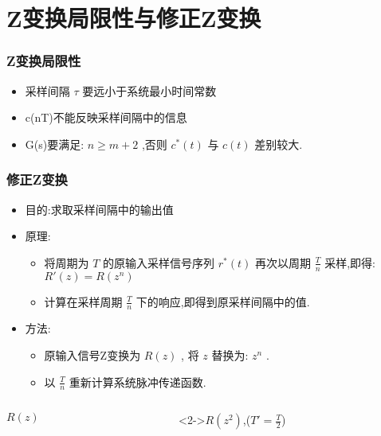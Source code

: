 \documentclass[table]{beamer}
\begin{document}
\section{Z变换局限性与修正Z变换}
\label{sec-5}
\begin{frame}
\frametitle{Z变换局限性}
\label{sec-5-1}

\begin{itemize}
\item <2->采样间隔 $\tau$  要远小于系统最小时间常数
\item <3->c(nT)不能反映采样间隔中的信息
\item <4->G(s)要满足:  $n\geq m+2$  ,否则  $c^*(t)$  与  $c(t)$  差别较大.
\end{itemize}
\end{frame}
\begin{frame}
\frametitle{修正Z变换}
\label{sec-5-2}

\begin{itemize}
\item 目的:求取采样间隔中的输出值
\item 原理:
\begin{itemize}
\item <2->将周期为  $T$  的原输入采样信号序列 $r^*(t)$ 再次以周期  $\frac{T}{n}$  采样,即得:  $R'(z)=R(z^n)$
\item <3->计算在采样周期  $\frac{T}{n}$  下的响应,即得到原采样间隔中的值.
\end{itemize}
\item 方法:
\begin{itemize}
\item <4->原输入信号Z变换为  $R(z)$ , 将 $z$  替换为:  $z^n$  .
\item <5->以  $\frac{T}{n}$ 重新计算系统脉冲传递函数.
\end{itemize}
\end{itemize}
\begin{columns}
\begin{column}{0.5\textwidth}
\begin{block}{$R(z)$}
\label{sec-5-2-1}

\end{block}
\end{column}
\begin{column}{0.5\textwidth}
\begin{block}<2->{$R(z^2)$,($T'=\frac{T}{2}$)}
\label{sec-5-2-2}


\end{block}
\end{column}
\end{columns}
\end{frame}
\end{document}
